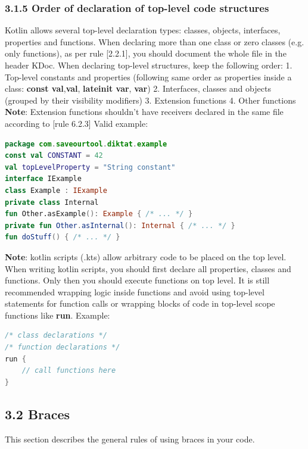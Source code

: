 \subsubsection*{\textbf{3.1.5 Order of declaration of top-level code structures}}
\leavevmode\newline
\label{sec:3.1.5}
Kotlin allows several top-level declaration types: classes, objects, interfaces, properties and functions.
When declaring more than one class or zero classes (e.g. only functions), as per rule [2.2.1], you should document the whole file in the header KDoc.
When declaring top-level structures, keep the following order:
1. Top-level constants and properties (following same order as properties inside a class: \textbf{const val},\textbf{val}, \textbf{lateinit var}, \textbf{var})
2. Interfaces, classes and objects (grouped by their visibility modifiers)
3. Extension functions
4. Other functions
\textbf{Note}:
Extension functions shouldn't have receivers declared in the same file according to [rule 6.2.3]
Valid example:
\begin{lstlisting}[language=Kotlin]
package com.saveourtool.diktat.example
const val CONSTANT = 42
val topLevelProperty = "String constant"
interface IExample
class Example : IExample
private class Internal
fun Other.asExample(): Example { /* ... */ }
private fun Other.asInternal(): Internal { /* ... */ }
fun doStuff() { /* ... */ }
\end{lstlisting}
\textbf{Note}:
kotlin scripts (.kts) allow arbitrary code to be placed on the top level. When writing kotlin scripts, you should first declare all properties, classes
and functions. Only then you should execute functions on top level. It is still recommended wrapping logic inside functions and avoid using top-level statements
for function calls or wrapping blocks of code in top-level scope functions like \textbf{run}.
Example:
\begin{lstlisting}[language=Kotlin]
/* class declarations */
/* function declarations */
run {
    // call functions here
}
\end{lstlisting}
\subsection*{\textbf{3.2 Braces}}
\label{sec:3.2}
This section describes the general rules of using braces in your code.
